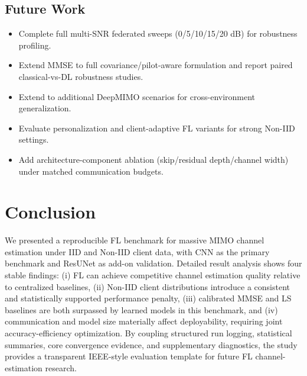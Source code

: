 \documentclass[onecolumn]{IEEEtran}
\begin{document}
\subsection{Future Work}
\begin{itemize}
    \item Complete full multi-SNR federated sweeps (0/5/10/15/20 dB) for robustness profiling.
    \item Extend MMSE to full covariance/pilot-aware formulation and report paired classical-vs-DL robustness studies.
    \item Extend to additional DeepMIMO scenarios for cross-environment generalization.
    \item Evaluate personalization and client-adaptive FL variants for strong Non-IID settings.
    \item Add architecture-component ablation (skip/residual depth/channel width) under matched communication budgets.
\end{itemize}

\section{Conclusion}
We presented a reproducible FL benchmark for massive MIMO channel estimation under IID and Non-IID client data, with CNN as the primary benchmark and ResUNet as add-on validation. Detailed result analysis shows four stable findings: (i) FL can achieve competitive channel estimation quality relative to centralized baselines, (ii) Non-IID client distributions introduce a consistent and statistically supported performance penalty, (iii) calibrated MMSE and LS baselines are both surpassed by learned models in this benchmark, and (iv) communication and model size materially affect deployability, requiring joint accuracy-efficiency optimization. By coupling structured run logging, statistical summaries, core convergence evidence, and supplementary diagnostics, the study provides a transparent IEEE-style evaluation template for future FL channel-estimation research.
\end{document}
